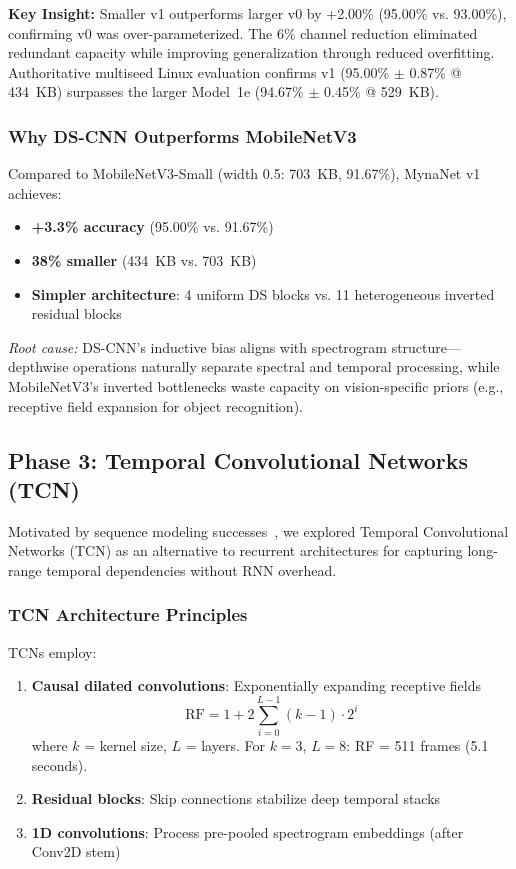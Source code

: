 \documentclass[conference]{IEEEtran}
\begin{document}
\noindent\textbf{Key Insight:} Smaller v1 outperforms larger v0 by +2.00\% (95.00\% vs. 93.00\%), confirming v0 was over-parameterized. The 6\% channel reduction eliminated redundant capacity while improving generalization through reduced overfitting. Authoritative multiseed Linux evaluation confirms v1 (95.00\% $\pm$ 0.87\% @ 434~KB) surpasses the larger Model~1e (94.67\% $\pm$ 0.45\% @ 529~KB).

\subsubsection{Why DS-CNN Outperforms MobileNetV3}

Compared to MobileNetV3-Small (width 0.5: 703~KB, 91.67\%), MynaNet v1 achieves:
\begin{itemize}
    \item \textbf{+3.3\% accuracy} (95.00\% vs. 91.67\%)
    \item \textbf{38\% smaller} (434~KB vs. 703~KB)
    \item \textbf{Simpler architecture}: 4 uniform DS blocks vs. 11 heterogeneous inverted residual blocks
\end{itemize}

\noindent\textit{Root cause:} DS-CNN's inductive bias aligns with spectrogram structure—depthwise operations naturally separate spectral and temporal processing, while MobileNetV3's inverted bottlenecks waste capacity on vision-specific priors (e.g., receptive field expansion for object recognition).

\subsection{Phase 3: Temporal Convolutional Networks (TCN)}
\label{sec:phase3}

Motivated by sequence modeling successes~\cite{bai2018empirical}, we explored Temporal Convolutional Networks (TCN) as an alternative to recurrent architectures for capturing long-range temporal dependencies without RNN overhead.

\subsubsection{TCN Architecture Principles}

TCNs employ:
\begin{enumerate}
    \item \textbf{Causal dilated convolutions}: Exponentially expanding receptive fields
    \begin{equation}
        \text{RF} = 1 + 2 \sum_{i=0}^{L-1} (k-1) \cdot 2^i
    \end{equation}
    where $k$ = kernel size, $L$ = layers. For $k=3$, $L=8$: RF = 511 frames (5.1 seconds).

    \item \textbf{Residual blocks}: Skip connections stabilize deep temporal stacks

    \item \textbf{1D convolutions}: Process pre-pooled spectrogram embeddings (after Conv2D stem)
\end{enumerate}
\end{document}
